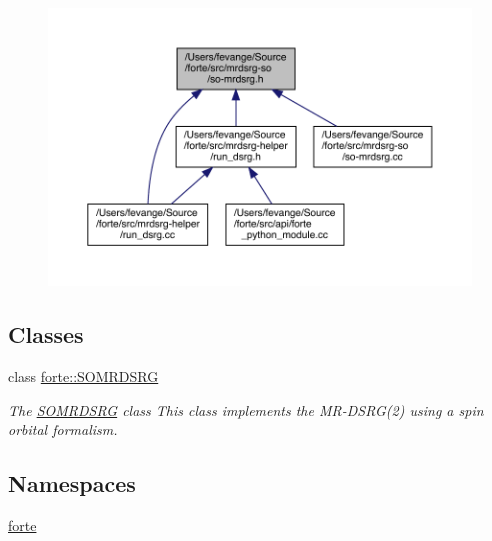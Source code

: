 \begin{figure}[H]
\begin{center}
\leavevmode
\includegraphics[width=350pt]{so-mrdsrg_8h__dep__incl}
\end{center}
\end{figure}
\subsection*{Classes}
\begin{DoxyCompactItemize}
\item 
class \mbox{\hyperlink{classforte_1_1_s_o_m_r_d_s_r_g}{forte\+::\+S\+O\+M\+R\+D\+S\+RG}}
\begin{DoxyCompactList}\small\item\em The \mbox{\hyperlink{classforte_1_1_s_o_m_r_d_s_r_g}{S\+O\+M\+R\+D\+S\+RG}} class This class implements the M\+R-\/\+D\+S\+RG(2) using a spin orbital formalism. \end{DoxyCompactList}\end{DoxyCompactItemize}
\subsection*{Namespaces}
\begin{DoxyCompactItemize}
\item 
 \mbox{\hyperlink{namespaceforte}{forte}}
\end{DoxyCompactItemize}
